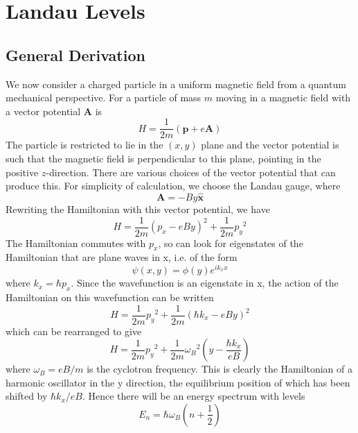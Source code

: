 \section{Landau Levels}
\subsection{General Derivation}
We now consider a charged particle in a uniform magnetic field from a quantum mechanical perspective. For a particle of mass $m$ moving in a magnetic field with a vector potential $\textbf{A}$ is 
\begin{equation}
    H=\frac{1}{2m}\left(\textbf{p}+e\textbf{A}\right)
\end{equation}
The particle is restricted to lie in the $(x,y)$ plane and the vector potential is such that the magnetic field is perpendicular to this plane, pointing in the positive $z$-direction. There are various choices of the vector potential that can produce this. For simplicity of calculation, we choose the Landau gauge, where
\begin{equation}
    \textbf{A}=-By\hat{\textbf{x}}
\end{equation}
Rewriting the Hamiltonian with this vector potential, we have
\begin{equation}
    H=\frac{1}{2m}\left(p_{x}-eBy\right)^2+\frac{1}{2m}{p_y}^2
\end{equation}
The Hamiltonian commutes with $p_x$, so can look for eigenstates of the Hamiltonian that are plane waves in x, i.e. of the form
\begin{equation}
    \psi(x,y)=\phi(y)e^{ik_xx}
\end{equation}
where $k_x=\hbar p_x$. Since the wavefunction is an eigenstate in x, the action of the Hamiltonian on this wavefunction can be written
\begin{equation}
    H=\frac{1}{2m}{p_y}^2+\frac{1}{2m}\left(\hbar k_x-eBy\right)^2
\end{equation}
which can be rearranged to give
\begin{equation}
    H=\frac{1}{2m}{p_y}^2+\frac{1}{2m}{\omega_B}^2\left(y-\frac{\hbar k_x}{eB}\right)
\end{equation}
where $\omega_B=eB/m$ is the cyclotron frequency. This is clearly the Hamiltonian of a harmonic oscillator in the y direction, the equilibrium position of which has been shifted by $\hbar k_x/eB$. Hence there will be an energy spectrum with levels
\begin{equation}
    E_n=\hbar \omega_B\left(n+\frac{1}{2}\right)
\end{equation}
